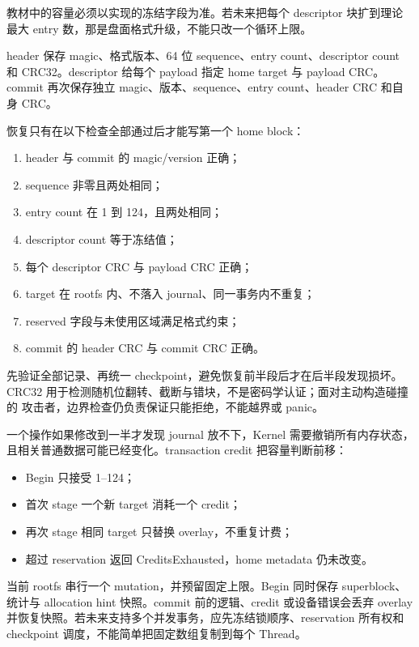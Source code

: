 \begin{contractbox}
教材中的容量必须以实现的冻结字段为准。若未来把每个 descriptor 块扩到理论
最大 entry 数，那是盘面格式升级，不能只改一个循环上限。
\end{contractbox}

header 保存 magic、格式版本、64 位 sequence、entry count、descriptor count
和 CRC32。descriptor 给每个 payload 指定 home target 与 payload CRC。commit
再次保存独立 magic、版本、sequence、entry count、header CRC 和自身 CRC。

恢复只有在以下检查全部通过后才能写第一个 home block：

\begin{enumerate}
  \item header 与 commit 的 magic/version 正确；
  \item sequence 非零且两处相同；
  \item entry count 在 1 到 124，且两处相同；
  \item descriptor count 等于冻结值；
  \item 每个 descriptor CRC 与 payload CRC 正确；
  \item target 在 rootfs 内、不落入 journal、同一事务内不重复；
  \item reserved 字段与未使用区域满足格式约束；
  \item commit 的 header CRC 与 commit CRC 正确。
\end{enumerate}

先验证全部记录、再统一 checkpoint，避免恢复前半段后才在后半段发现损坏。
CRC32 用于检测随机位翻转、截断与错块，不是密码学认证；面对主动构造碰撞的
攻击者，边界检查仍负责保证只能拒绝，不能越界或 panic。

一个操作如果修改到一半才发现 journal 放不下，Kernel 需要撤销所有内存状态，
且相关普通数据可能已经变化。transaction credit 把容量判断前移：

\begin{itemize}
  \item Begin 只接受 1--124；
  \item 首次 stage 一个新 target 消耗一个 credit；
  \item 再次 stage 相同 target 只替换 overlay，不重复计费；
  \item 超过 reservation 返回 CreditsExhausted，home metadata 仍未改变。
\end{itemize}

当前 rootfs 串行一个 mutation，并预留固定上限。Begin 同时保存 superblock、
统计与 allocation hint 快照。commit 前的逻辑、credit 或设备错误会丢弃
overlay 并恢复快照。若未来支持多个并发事务，应先冻结锁顺序、reservation
所有权和 checkpoint 调度，不能简单把固定数组复制到每个 Thread。

